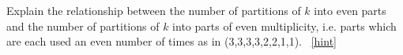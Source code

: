\documentclass{book}
\begin{document}
\setcounter{project}{306}
\addtocounter{project}{-1}
\begin{activity}[]\label{partition-even-mult-even-use}
\hypertarget{p-1551}{}%
Explain the relationship between the number of partitions of \(k\) into even parts and the number of partitions of \(k\) into parts of even multiplicity, i.e. parts which are each used an even number of times as in (3,3,3,3,2,2,1,1).%
~\hfill{\tiny\hyperlink{a-306}{[hint]}\hypertarget{q-306}{}}\end{activity}
\end{document}
